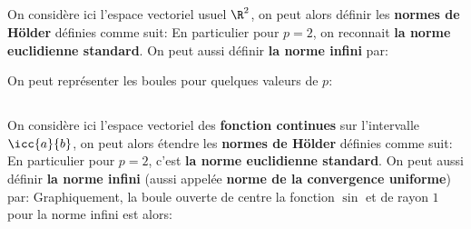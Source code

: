\subsection*{}
On considère ici l'espace vectoriel usuel \(\R^2\), on peut alors définir les \textbf{normes de Hölder} définies comme suit:
En particulier pour \(p=2\), on reconnait \textbf{la norme euclidienne standard}. On peut aussi définir \textbf{la norme infini} par:

On peut représenter les boules pour quelques valeurs de \(p\):
\begin{center}
\end{center}

\pagebreak
\subsection*{}
On considère ici l'espace vectoriel des \textbf{fonction continues} sur l'intervalle \(\icc{a}{b}\), on peut alors étendre les \textbf{normes de Hölder} définies comme suit:
En particulier pour \(p=2\), c'est \textbf{la norme euclidienne standard}. On peut aussi définir \textbf{la norme infini} (aussi appelée \textbf{norme de la convergence uniforme}) par:
Graphiquement, la boule ouverte de centre la fonction \(\sin\) et de rayon \(1\) pour la norme infini est alors:\<

